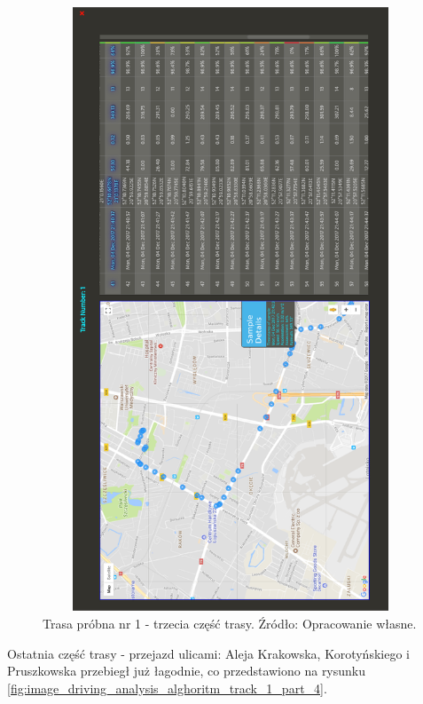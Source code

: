 \begin{figure}[H]
	\centering
	\includegraphics[height=18cm, width=13cm]{img/driving_analysis/test_track_part_3.png}
	\caption{Trasa próbna nr 1 - trzecia część trasy. Źródło: Opracowanie własne.}
	\label{fig:image_driving_analysis_alghoritm_track_1_part_3}
\end{figure}

Ostatnia część trasy - przejazd ulicami: Aleja Krakowska, Korotyńskiego i Pruszkowska przebiegł już łagodnie, co przedstawiono na rysunku \ref{fig:image_driving_analysis_alghoritm_track_1_part_4}.

